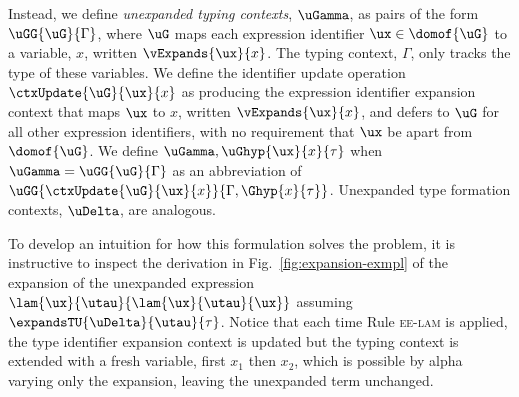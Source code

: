 \documentclass[acmsmall]{acmart}
\begin{document}
Instead, we define \emph{unexpanded typing contexts}, $\uGamma$, as pairs of the form $\uGG{\uG}{\Gamma}$, where $\uG$ maps each expression identifier $\ux \in \domof{\uG}$ to a variable, $x$, written $\vExpands{\ux}{x}$. The typing context, $\Gamma$, only tracks the type of these variables. We define the identifier update operation $\ctxUpdate{\uG}{\ux}{x}$ as producing the expression identifier expansion context that maps $\ux$ to $x$, written $\vExpands{\ux}{x}$, and defers to $\uG$ for all other expression identifiers, with no requirement that $\ux$ be apart from $\domof{\uG}$. %
We define $\uGamma, \uGhyp{\ux}{x}{\tau}$ when $\uGamma = \uGG{\uG}{\Gamma}$ as an abbreviation of $\uGG{\ctxUpdate{\uG}{\ux}{x}}{\Gamma, \Ghyp{x}{\tau}}$. Unexpanded type formation contexts, $\uDelta$, are analogous. 

To develop an intuition for how this formulation solves the problem, it is instructive to inspect the derivation in Fig.~\ref{fig:expansion-exmpl} of the expansion of the unexpanded expression $\lam{\ux}{\utau}{\lam{\ux}{\utau}{\ux}}$ assuming $\expandsTU{\uDelta}{\utau}{\tau}$. Notice that each time Rule \textsc{ee-lam} is applied, the type identifier expansion context is updated but the typing context is extended with a fresh variable, first $x_1$ then $x_2$, which is possible by alpha varying only the expansion, leaving the unexpanded term unchanged. %

\end{document}
